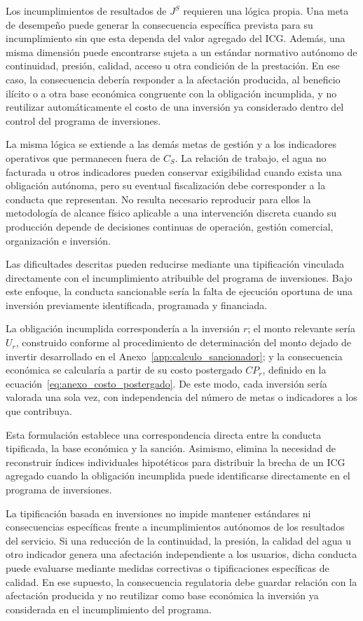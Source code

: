 Los incumplimientos de resultados de \(J^{S}\) requieren una lógica propia. Una meta de desempeño puede generar la consecuencia específica prevista para su incumplimiento sin que esta dependa del valor agregado del ICG. Además, una misma dimensión puede encontrarse sujeta a un estándar normativo autónomo de continuidad, presión, calidad, acceso u otra condición de la prestación. En ese caso, la consecuencia debería responder a la afectación producida, al beneficio ilícito o a otra base económica congruente con la obligación incumplida, y no reutilizar automáticamente el costo de una inversión ya considerado dentro del control del programa de inversiones.

La misma lógica se extiende a las demás metas de gestión y a los indicadores operativos que permanecen fuera de \(C_S\). La relación de trabajo, el agua no facturada u otros indicadores pueden conservar exigibilidad cuando exista una obligación autónoma, pero su eventual fiscalización debe corresponder a la conducta que representan. No resulta necesario reproducir para ellos la metodología de alcance físico aplicable a una intervención discreta cuando su producción depende de decisiones continuas de operación, gestión comercial, organización e inversión.

Las dificultades descritas pueden reducirse mediante una tipificación vinculada directamente con el incumplimiento atribuible del programa de inversiones. Bajo este enfoque, la conducta sancionable sería la falta de ejecución oportuna de una inversión previamente identificada, programada y financiada.

La obligación incumplida correspondería a la inversión \(r\); el monto relevante sería \(U_r\), construido conforme al procedimiento de determinación del monto dejado de invertir desarrollado en el Anexo~\ref{app:calculo_sancionador}; y la consecuencia económica se calcularía a partir de su costo postergado \(CP_r\), definido en la ecuación~\eqref{eq:anexo_costo_postergado}. De este modo, cada inversión sería valorada una sola vez, con independencia del número de metas o indicadores a los que contribuya.

Esta formulación establece una correspondencia directa entre la conducta tipificada, la base económica y la sanción. Asimismo, elimina la necesidad de reconstruir índices individuales hipotéticos para distribuir la brecha de un ICG agregado cuando la obligación incumplida puede identificarse directamente en el programa de inversiones.

La tipificación basada en inversiones no impide mantener estándares ni consecuencias específicas frente a incumplimientos autónomos de los resultados del servicio. Si una reducción de la continuidad, la presión, la calidad del agua u otro indicador genera una afectación independiente a los usuarios, dicha conducta puede evaluarse mediante medidas correctivas o tipificaciones específicas de calidad. En ese supuesto, la consecuencia regulatoria debe guardar relación con la afectación producida y no reutilizar como base económica la inversión ya considerada en el incumplimiento del programa.

